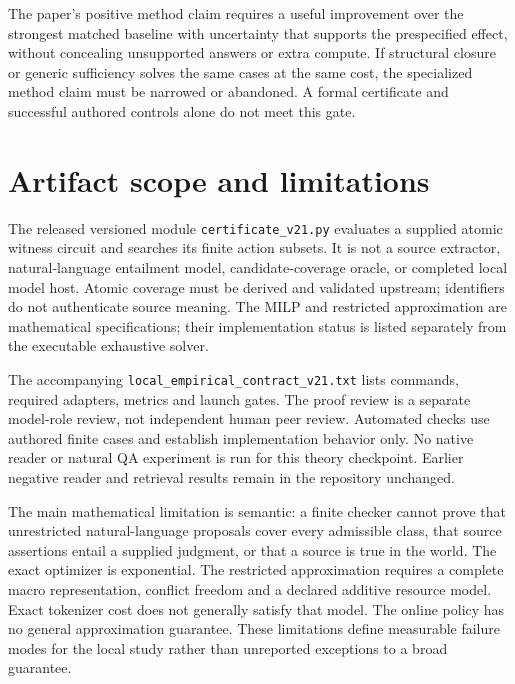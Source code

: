 \documentclass[11pt]{article}
\theoremstyle{definition}
\theoremstyle{remark}
\begin{document}
The paper's positive method claim requires a useful improvement over the
strongest matched baseline with uncertainty that supports the prespecified
effect, without concealing unsupported answers or extra compute. If structural
closure or generic sufficiency solves the same cases at the same cost, the
specialized method claim must be narrowed or abandoned. A formal certificate
and successful authored controls alone do not meet this gate.

\section{Artifact scope and limitations}
The released versioned module \texttt{certificate\_v21.py} evaluates a supplied
atomic witness circuit and searches its finite action subsets. It is not a
source extractor, natural-language entailment model, candidate-coverage oracle,
or completed local model host. Atomic coverage must be derived and validated
upstream; identifiers do not authenticate source meaning. The MILP and restricted
approximation are mathematical specifications; their implementation status is
listed separately from the executable exhaustive solver.

The accompanying \texttt{local\_empirical\_contract\_v21.txt} lists commands,
required adapters, metrics and launch gates. The proof review is a separate
model-role review, not independent human peer review. Automated checks use
authored finite cases and establish implementation behavior only. No native
reader or natural QA experiment is run for this theory checkpoint. Earlier
negative reader and retrieval results remain in the repository unchanged.

The main mathematical limitation is semantic: a finite checker cannot prove
that unrestricted natural-language proposals cover every admissible class,
that source assertions entail a supplied judgment, or that a source is true
in the world. The exact optimizer is exponential. The restricted approximation
requires a complete macro representation, conflict freedom and a declared
additive resource model. Exact tokenizer cost does not generally satisfy that
model. The online policy has no general approximation guarantee. These
limitations define measurable failure modes for the local study rather than
unreported exceptions to a broad guarantee.

{\raggedright

}
\end{document}

